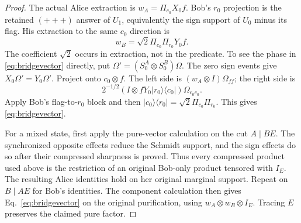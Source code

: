 \begin{proof}
The actual Alice extraction is $w_A=\Pi_{c_0}X_0f$. Bob's $r_0$ projection is the retained $(+++)$ answer of $U_1$, equivalently the sign support of $U_0$ minus its flag. His extraction to the same $c_0$ direction is
\[
 w_B=\sqrt2\Pi_{c_0}\Pi_{r_0}Y_0f.
\]
The coefficient $\sqrt2$ occurs in extraction, not in the predicate. To see the phase in \eqref{eq:bridgevector} directly, put $\Omega'=(S_0^A\otimes S_0^B)\Omega$. The zero sign events give $X_0\Omega'=Y_0\Omega'$. Project onto $c_0\otimes f$. The left side is $(w_A\otimes I)\Omega_{ff}$; the right side is
\[
 2^{-1/2}(I\otimes fY_0|r_0\rangle\langle c_0|)
       \Omega_{c_0c_0}.
\]
Apply Bob's flag-to-$r_0$ block and then $|c_0\rangle\langle r_0|=\sqrt2\Pi_{c_0}\Pi_{r_0}$. This gives \eqref{eq:bridgevector}.

For a mixed state, first apply the pure-vector calculation on the cut $A\mid BE$. The synchronized opposite effects reduce the Schmidt support, and the sign effects do so after their compressed sharpness is proved. Thus every compressed product used above is the restriction of an original Bob-only product tensored with $I_E$. The resulting Alice identities hold on her original marginal support. Repeat on $B\mid AE$ for Bob's identities. The component calculation then gives Eq.~\eqref{eq:bridgevector} on the original purification, using $w_A\otimes w_B\otimes I_E$. Tracing $E$ preserves the claimed pure factor.
\end{proof}

